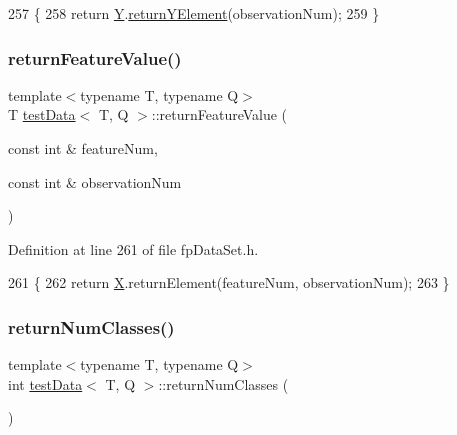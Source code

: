\begin{DoxyCode}
257                                                                     \{
258             \textcolor{keywordflow}{return} \hyperlink{classtestData_a97961fe071062be1146fcbcb1aaf7a00}{Y}.\hyperlink{classinputYData_affffd6432eaa11acc46fc83fb4ce409a}{returnYElement}(observationNum);
259         \}
\end{DoxyCode}
\mbox{\label{classtestData_aec2686210c4776df10cc0658133ed4ad}} 
\subsubsection{\texorpdfstring{return\+Feature\+Value()}{returnFeatureValue()}}
{\footnotesize\ttfamily template$<$typename T, typename Q$>$ \\
T \hyperlink{classtestData}{test\+Data}$<$ T, Q $>$\+::return\+Feature\+Value (\begin{DoxyParamCaption}\item[{const int \&}]{feature\+Num,  }\item[{const int \&}]{observation\+Num }\end{DoxyParamCaption})\hspace{0.3cm}{\ttfamily [inline]}}



Definition at line 261 of file fp\+Data\+Set.\+h.


\begin{DoxyCode}
261                                                                                      \{
262             \textcolor{keywordflow}{return} \hyperlink{classtestData_aaed20c168b252c39fb9dc56757315eee}{X}.returnElement(featureNum, observationNum);
263         \}
\end{DoxyCode}
\mbox{\label{classtestData_a002c37538a2877f8c493b9a27e710be7}} 
\subsubsection{\texorpdfstring{return\+Num\+Classes()}{returnNumClasses()}}
{\footnotesize\ttfamily template$<$typename T, typename Q$>$ \\
int \hyperlink{classtestData}{test\+Data}$<$ T, Q $>$\+::return\+Num\+Classes (\begin{DoxyParamCaption}{ }\end{DoxyParamCaption})\hspace{0.3cm}{\ttfamily [inline]}}



